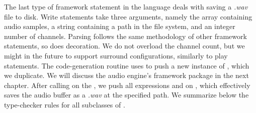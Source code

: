 The last type of framework statement in the language deals with saving a \emph{.wav} file to disk. Write statements take three arguments, namely the array containing audio samples, a string containing a path in the file system, and an integer number of channels. Parsing follows the same methodology of other framework statements, so does decoration. We do not overload the channel count, but we might in the future to support surround configurations, similarly to play statements. The code-generation routine uses  to push a new instance of , which we duplicate. We will discuss the audio engine's framework package in the next chapter. After calling  on the , we push all expressions and  on , which effectively saves the audio buffer as a \emph{.wav} at the specified path. We summarize below the type-checker rules for all subclasses of .

